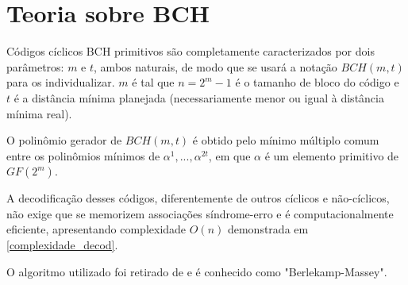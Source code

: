 \section{Teoria sobre BCH}

Códigos cíclicos BCH primitivos são completamente caracterizados por dois parâmetros: $m$ e $t$, ambos naturais, de modo que se usará a notação $BCH(m,t)$ para os individualizar. $m$ é tal que $n=2^m-1$ é o tamanho de bloco do código e $t$ é a distância mínima planejada (necessariamente menor ou igual à distância mínima real). 

O polinômio gerador de $BCH(m,t)$ é obtido pelo mínimo múltiplo comum entre os polinômios mínimos de $\alpha^1, ..., \alpha^{2t}$, em que $\alpha$ é um elemento primitivo de $GF(2^m)$.

A decodificação desses códigos, diferentemente de outros cíclicos e não-cíclicos, não exige que se memorizem associações síndrome-erro e é computacionalmente eficiente, apresentando complexidade $O(n)$ demonstrada em \ref{complexidade_decod}.

O algoritmo utilizado foi retirado de \cite{ref:algoritmo-berlekamp} e é conhecido como "Berlekamp-Massey".